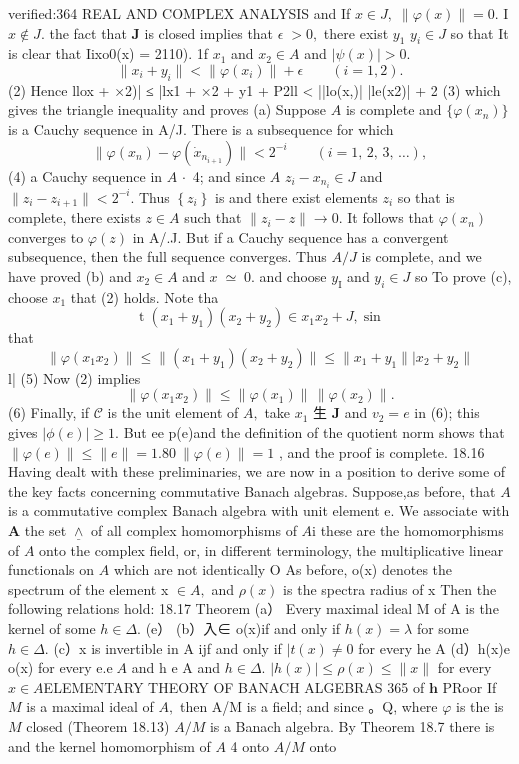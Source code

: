 verified:364 REAL AND COMPLEX ANALYSIS and If $x\in J,\;\|\varphi(x)\|=0.$ I $x\notin J.$ the fact that $\boldsymbol{J}$ is closed implies that $\scriptstyle\epsilon\;>0,$ there exist $y_{\mathrm{1}}$ $y_{i}\in J$ so that It is clear that Iixo0(x) = 2110). 1f $x_{1}$ and $x_{2}\in A$ and $|\psi(x)|>0.$ $$ \|x_{i}+y_{i}\|<\|\varphi(x_{i})\|+\epsilon\qquad(i=1,2). $$ (2) Hence llox + ×2)| ≤ |lx1 + ×2 + y1 + P2ll < ||lo(x,)| |le(x2)| + 2 (3) which gives the triangle inequality and proves (a) Suppose $\scriptstyle A$ is complete and $\{\varphi(x_{n})\}$ is a Cauchy sequence in A/J. There is a subsequence for which $$ \|\varphi(x_{n})-\varphi(\dot{x}_{n_{i+1}})\|<2^{-i}\qquad(i=1,\,2,\,3,\,\ldots), $$ (4) a Cauchy sequence in $A\,\cdot$ 4; and since $\scriptstyle A$ $z_{i}-x_{n_{i}}\in J$ and $\|z_{i}-z_{i+1}\|<2^{-i}.$ Thus $\left\{z_{i}\right\}$ is and there exist elements $z_{i}$ so that is complete, there exists $z\in A$ such that $\|z_{i}-z\|\to0.$ It follows that $\varphi(x_{n})$ converges to $\varphi(z)$ in A/.J. But if a Cauchy sequence has a convergent subsequence, then the full sequence converges. Thus $A/J$ is complete, and we have proved (b) and $x_{2}\in A$ and $\scriptstyle x\;\simeq\;0.$ and choose $y_{\mathrm{I}}$ and $y_{i}\in J$ so To prove (c), choose $x_{1}$ that (2) holds. Note tha $$ \operatorname{t}\left(x_{1}+y_{1}\right)\left(x_{2}+y_{2}\right)\in x_{1}x_{2}+J,\sin $$ that $$ \|\varphi(x_{1}x_{2})\|\leq\|(x_{1}+y_{1})(x_{2}+y_{2})\|\leq\|x_{1}+y_{1}\||x_{2}+y_{2}\| $$ l| (5) Now (2) implies $$ \|\varphi(x_{1}x_{2})\|\leq\|\varphi(x_{1})\|\,\|\varphi(x_{2})\|. $$ (6) Finally, if ${\mathcal{C}}$ is the unit element of $A,$ take $x_{1}$ 生 $\boldsymbol{J}$ and $\scriptstyle v_{2}=e$ in (6); this gives $|\phi(e)|\geq1.$ But ee p(e)and the definition of the quotient norm shows that $\|\varphi(e)\|\le\|e\|=1.80\ \|\varphi(e)\|=1$ , and the proof is complete. 18.16 Having dealt with these preliminaries, we are now in a position to derive some of the key facts concerning commutative Banach algebras. Suppose,as before, that $\scriptstyle A$ is a commutative complex Banach algebra with unit element e. We associate with ${\boldsymbol{A}}$ the set $\underline{{\land}}$ of all complex homomorphisms of $A{\mathrm{i}}$ these are the homomorphisms of $\scriptstyle A$ onto the complex field, or, in different terminology, the multiplicative linear functionals on $\scriptstyle A$ which are not identically O As before, o(x) denotes the spectrum of the element x $\in A,$ and $\scriptstyle{\rho(x)}$ is the spectra radius of x Then the following relations hold: 18.17 Theorem (a） Every maximal ideal M of A is the kernel of some $h\in\Delta.$ (e） (b）入∈ o(x)if and only if $h(x)=\lambda$ for some $h\in\Delta.$ (c）x is invertible in A ijf and only if $|t(x)\neq0$ for every he A (d）h(x)e o(x) for every $\mathrm{e.e\;}A$ and h e A and $h\in\Delta.$ $|h(x)|\leq\rho(x)\leq\|x\|$ for every $x\in A$ELEMENTARY THEORY OF BANACH ALGEBRAS 365 of ${\boldsymbol{h}}$ PRoor If $\textstyle{M}$ is a maximal ideal of $A,$ then A/M is a field; and since 。Q, where $\varphi$ is the is $\textstyle{M}$ closed (Theorem 18.13) $A/M$ is a Banach algebra. By Theorem 18.7 there is and the kernel homomorphism of $\scriptstyle A$ 4 onto $A/M$ onto 